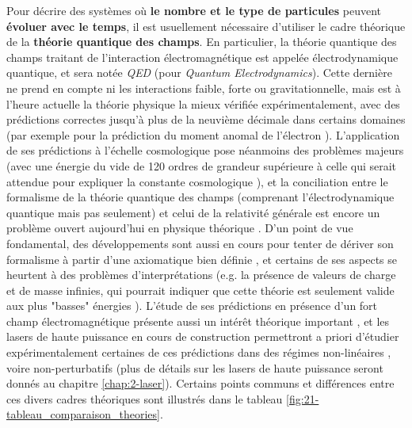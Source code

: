 \begin{refsection}
Pour décrire des systèmes où \textbf{le nombre et le type de particules} peuvent \textbf{évoluer avec le temps}, il est usuellement nécessaire d'utiliser le cadre théorique de la \textbf{théorie quantique des champs}. En particulier, la théorie quantique des champs traitant de l'interaction électromagnétique est appelée électrodynamique quantique, et sera notée \textit{QED} (pour \textit{Quantum Electrodynamics}). Cette dernière ne prend en compte ni les interactions faible, forte ou gravitationnelle, mais est à l'heure actuelle la théorie physique la mieux vérifiée expérimentalement, avec des prédictions correctes jusqu'à plus de la neuvième décimale dans certains domaines (par exemple pour la prédiction du moment anomal de l'électron \parencite{klauber_2015}). L'application de ses prédictions à l'échelle cosmologique pose néanmoins des problèmes majeurs (avec une énergie du vide de 120 ordres de grandeur supérieure à celle qui serait attendue pour expliquer la constante cosmologique \parencite{weinberg_1989}), et la conciliation entre le formalisme de la théorie quantique des champs (comprenant l'électrodynamique quantique mais pas seulement) et celui de la relativité générale est encore un problème ouvert aujourd'hui en physique théorique \parencite{klauber_2015, kuhlmann_2018}. D'un point de vue fondamental, des développements sont aussi en cours pour tenter de dériver son formalisme à partir d'une axiomatique bien définie \parencite{kuhlmann_2018}, et certains de ses aspects se heurtent à des problèmes d'interprétations (e.g. la présence de valeurs de charge et de masse infinies, qui pourrait indiquer que cette théorie est seulement valide aux plus "basses" énergies \parencite{kuhlmann_2018, teller_1997}). L'étude de ses prédictions en présence d'un fort champ électromagnétique présente aussi un intérêt théorique important \parencite{dipiazza_2012, dunne_2009}, et les lasers de haute puissance en cours de construction permettront a priori d'étudier expérimentalement certaines de ces prédictions dans des régimes non-linéaires \parencite{dipiazza_2012}, voire non-perturbatifs \parencite{dipiazza_2012, dunne_2009} (plus de détails sur les lasers de haute puissance seront donnés au chapitre \ref{chap:2-laser}). Certains points communs et différences entre ces divers cadres théoriques sont illustrés dans le tableau \ref{fig:21-tableau_comparaison_theories}.


\end{refsection}
